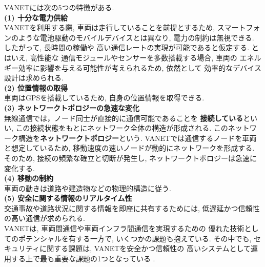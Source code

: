VANETには次の5つの特徴がある.\\[0.5em]
\noindent\textbf{(1) 十分な電力供給}\\
\indent VANETを利用する際, 車両は走行していることを前提とするため, 
スマートフォンのような電池駆動のモバイルデバイスとは異なり, 
電力の制約は無視できる. したがって, 長時間の稼働や
高い通信レートの実現が可能であると仮定する. とはいえ, 高性能な
通信モジュールやセンサーを多数搭載する場合, 車両の
エネルギー効率に影響を与える可能性が考えられるため, 依然として
効率的なデバイス設計は求められる.\\[1em]
\noindent\textbf{(2) 位置情報の取得}\\
\indent 車両はGPSを搭載しているため, 自身の位置情報を取得できる.\\[1em]
\noindent\textbf{(3) ネットワークトポロジーの急速な変化}\\
\indent 無線通信では，ノード同士が直接的に通信可能であることを
\textbf{接続している}といい, この接続状態をもとにネットワーク全体の構造が形成される. 
このネットワーク構造を\textbf{ネットワークトポロジー}という. 
VANETでは通信するノードを車両と想定しているため, 
移動速度の速いノードが動的にネットワークを形成する. 
そのため, 接続の頻繁な確立と切断が発生し, 
ネットワークトポロジーは急速に変化する. \\[1em]
\noindent\textbf{(4) 移動の制約}\\
\indent 車両の動きは道路や建造物などの物理的構造に従う.\\[1em]
\noindent\textbf{(5) 安全に関する情報のリアルタイム性}\\
\indent 交通事故や道路状況に関する情報を即座に共有するためには, 
低遅延かつ信頼性の高い通信が求められる.\\

VANETは, 車両間通信や車両インフラ間通信を実現するための
優れた技術としてのポテンシャルを有する一方で, 
いくつかの課題も抱えている.
その中でも, セキュリティに関する課題は, VANETを安全かつ信頼性の
高いシステムとして運用する上で最も重要な課題の1つとなっている
\cite{vanet-challenge,vanet-security}.\\

